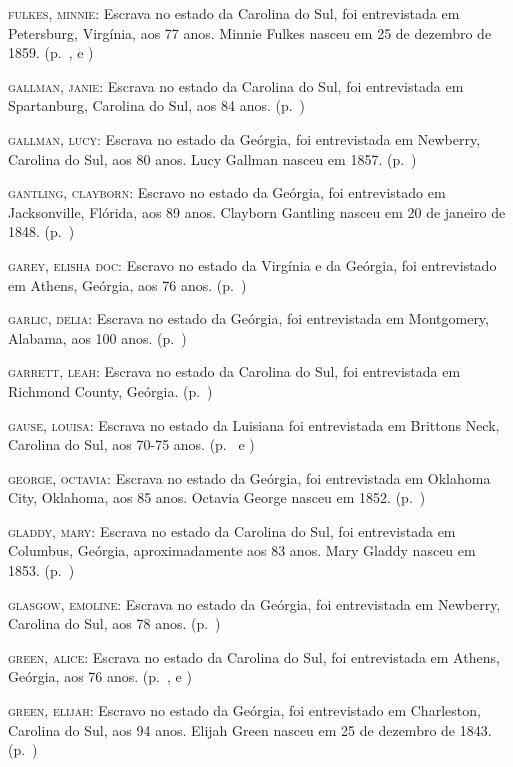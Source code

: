 \begin{Parskip}
\textsc{fulkes, minnie:} Escrava no estado da Carolina do Sul, foi
entrevistada em Petersburg, Virgínia, aos 77 anos. Minnie Fulkes nasceu
em 25 de dezembro de 1859. (p.~\pageref{ref94}, \pageref{ref95} e \pageref{ref96})

\textsc{gallman, janie:} Escrava no estado da Carolina do Sul, foi
entrevistada em Spartanburg, Carolina do Sul, aos 84 anos. (p.~\pageref{ref97})

\textsc{gallman, lucy:} Escrava no estado da Geórgia, foi entrevistada
em Newberry, Carolina do Sul, aos 80 anos. Lucy Gallman nasceu em 1857. (p.~\pageref{ref98})

\textsc{gantling, clayborn:} Escravo no estado da Geórgia, foi
entrevistado em Jacksonville, Flórida, aos 89 anos. Clayborn Gantling
nasceu em 20 de janeiro de 1848. (p.~\pageref{ref99})

\textsc{garey, elisha doc:} Escravo no estado da Virgínia e da Geórgia,
foi entrevistado em Athens, Geórgia, aos 76 anos. (p.~\pageref{ref100})

\textsc{garlic, delia:} Escrava no estado da Geórgia, foi entrevistada
em Montgomery, Alabama, aos 100 anos. (p.~\pageref{ref101})

\textsc{garrett, leah:} Escrava no estado da Carolina do Sul, foi
entrevistada em Richmond County, Geórgia. (p.~\pageref{ref102})

\textsc{gause, louisa:} Escrava no estado da Luisiana foi entrevistada
em Brittons Neck, Carolina do Sul, aos 70-75 anos. (p.~\pageref{ref103} e \pageref{ref104})

\textsc{george, octavia:} Escrava no estado da Geórgia, foi entrevistada
em Oklahoma City, Oklahoma, aos 85 anos. Octavia George nasceu em 1852. (p.~\pageref{ref105})

\textsc{gladdy, mary:} Escrava no estado da Carolina do Sul, foi
entrevistada em Columbus, Geórgia, aproximadamente aos 83 anos. Mary
Gladdy nasceu em 1853. (p.~\pageref{ref106})

\textsc{glasgow, emoline:} Escrava no estado da Geórgia, foi
entrevistada em Newberry, Carolina do Sul, aos 78 anos. (p.~\pageref{ref107})

\textsc{green, alice:} Escrava no estado da Carolina do Sul, foi
entrevistada em Athens, Geórgia, aos 76 anos. (p.~\pageref{ref108}, \pageref{ref109} e \pageref{ref110})

\textsc{green, elijah:} Escravo no estado da Geórgia, foi entrevistado
em Charleston, Carolina do Sul, aos 94 anos. Elijah Green nasceu em 25
de dezembro de 1843. (p.~\pageref{ref111})


\end{Parskip}

